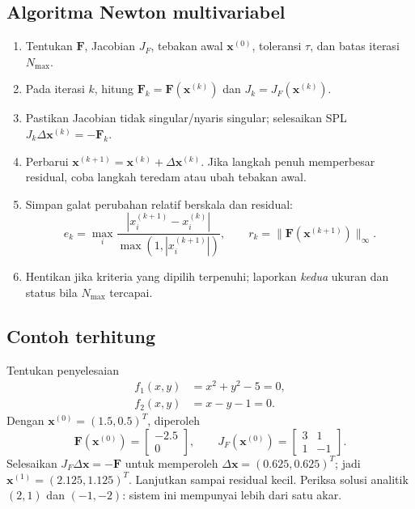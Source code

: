\subsection{Algoritma Newton multivariabel}
\begin{enumerate}
\item Tentukan $\mathbf{F}$, Jacobian $J_F$, tebakan awal $\mathbf{x}^{(0)}$, toleransi $\tau$, dan batas iterasi $N_{\max}$.
\item Pada iterasi $k$, hitung $\mathbf{F}_k=\mathbf{F}(\mathbf{x}^{(k)})$ dan $J_k=J_F(\mathbf{x}^{(k)})$.
\item Pastikan Jacobian tidak singular/nyaris singular; selesaikan SPL $J_k\Delta\mathbf{x}^{(k)}=-\mathbf{F}_k$.
\item Perbarui $\mathbf{x}^{(k+1)}=\mathbf{x}^{(k)}+\Delta\mathbf{x}^{(k)}$. Jika langkah penuh memperbesar residual, coba langkah teredam atau ubah tebakan awal.
\item Simpan galat perubahan relatif berskala dan residual:
\begin{equation}
 e_k=\max_i\frac{|x_i^{(k+1)}-x_i^{(k)}|}{\max(1,|x_i^{(k+1)}|)},
 \qquad r_k=\|\mathbf{F}(\mathbf{x}^{(k+1)})\|_\infty.
\end{equation}
\item Hentikan jika kriteria yang dipilih terpenuhi; laporkan \emph{kedua} ukuran dan status bila $N_{\max}$ tercapai.
\end{enumerate}

\subsection{Contoh terhitung}
Tentukan penyelesaian
\begin{align}
f_1(x,y)&=x^2+y^2-5=0,\\
f_2(x,y)&=x-y-1=0.
\end{align}
Dengan $\mathbf{x}^{(0)}=(1.5,0.5)^T$, diperoleh
\begin{equation}
\mathbf{F}(\mathbf{x}^{(0)})=\begin{bmatrix}-2.5\\0\end{bmatrix},\qquad
J_F(\mathbf{x}^{(0)})=\begin{bmatrix}3&1\\1&-1\end{bmatrix}.
\end{equation}
Selesaikan $J_F\Delta\mathbf{x}=-\mathbf{F}$ untuk memperoleh $\Delta\mathbf{x}=(0.625,0.625)^T$; jadi $\mathbf{x}^{(1)}=(2.125,1.125)^T$. Lanjutkan sampai residual kecil. Periksa solusi analitik $(2,1)$ dan $(-1,-2)$: sistem ini mempunyai lebih dari satu akar.

